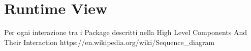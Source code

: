 \documentclass[../../../../dd.tex]{subfiles}
\begin{document}
	\section{Runtime View}
		Per ogni interazione tra i Package descritti nella High Level Components And Their Interaction
		https://en.wikipedia.org/wiki/Sequence_diagram
	
\end{document}
